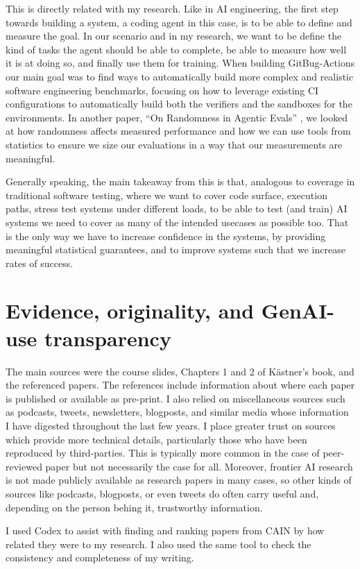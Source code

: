\documentclass[11pt,a4paper]{article}
\begin{document}
This is directly related with my research.
Like in AI engineering, the first step towards building a system, a coding agent in this case, is to be able to define and measure the goal.
In our scenario and in my research, we want to be define the kind of tasks the agent should be able to complete, be able to measure how well it is at doing so, and finally use them for training.
When building GitBug-Actions \cite{saavedra2024gitbug} our main goal was to find ways to automatically build more complex and realistic software engineering benchmarks, focusing on how to leverage existing CI configurations to automatically build both the verifiers and the sandboxes for the environments.
In another paper, ``On Randomness in Agentic Evals'' \cite{bjarnason2026randomness}, we looked at how randomness affects measured performance and how we can use tools from statistics to ensure we size our evaluations in a way that our measurements are meaningful.

Generally speaking, the main takeaway from this is that, analogous to coverage in traditional software testing, where we want to cover code surface, execution paths, stress test systems under different loads, to be able to test (and train) AI systems we need to cover as many of the intended usecases as possible too.
That is the only way we have to increase confidence in the systems, by providing meaningful statistical guarantees, and to improve systems such that we increase rates of success.

\section{Evidence, originality, and GenAI-use transparency}

The main sources were the course slides, Chapters 1 and 2 of K\"astner's book, and the referenced papers.
The references include information about where each paper is published or available as pre-print.
I also relied on miscellaneous sources such as podcasts, tweets, newsletters, blogposts, and similar media whose information I have digested throughout the last few years.
I place greater trust on sources which provide more technical details, particularly those who have been reproduced by third-parties. This is typically more common in the case of peer-reviewed paper but not necessarily the case for all. Moreover, frontier AI research is not made publicly available as research papers in many cases, so other kinds of sources like podcasts, blogposts, or even tweets do often carry useful and, depending on the person behing it, trustworthy information.

I used Codex to assist with finding and ranking papers from CAIN by how related they were to my research.
I also used the same tool to check the consistency and completeness of my writing.



\end{document}
